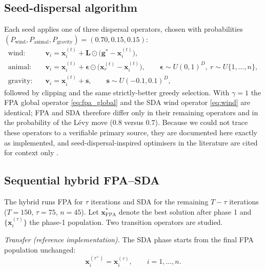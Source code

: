 \documentclass[10pt,letterpaper]{article}
\begin{document}
\subsection{Seed-dispersal algorithm}
Each seed applies one of three dispersal operators, chosen with probabilities $(P_{\mathrm{wind}},P_{\mathrm{animal}},P_{\mathrm{gravity}})=(0.70,0.15,0.15)$:
\begin{align}
\text{wind:}\quad & \mathbf{v}_i=\mathbf{x}_i^{(t)}+\mathbf{L}\odot\bigl(\mathbf{g}^{*}-\mathbf{x}_i^{(t)}\bigr),\label{eq:wind}\\
\text{animal:}\quad & \mathbf{v}_i=\mathbf{x}_i^{(t)}+\bm{\epsilon}\odot\bigl(\mathbf{x}_r^{(t)}-\mathbf{x}_i^{(t)}\bigr),\qquad \bm{\epsilon}\sim U(0,1)^D,\ r\sim U\{1,\dots,n\},\label{eq:animal}\\
\text{gravity:}\quad & \mathbf{v}_i=\mathbf{x}_i^{(t)}+\mathbf{s},\qquad \mathbf{s}\sim U(-0.1,0.1)^D,\label{eq:gravity}
\end{align}
followed by clipping and the same strictly-better greedy selection. With $\gamma=1$ the FPA global operator \eqref{eq:fpa_global} and the SDA wind operator \eqref{eq:wind} are identical; FPA and SDA therefore differ only in their remaining operators and in the probability of the Lévy move ($0.8$ versus $0.7$). Because we could not trace these operators to a verifiable primary source, they are documented here exactly as implemented, and seed-dispersal-inspired optimisers in the literature are cited for context only \citep{sulaiman2015sbppa,mohammadi2020ffa}.

\subsection{Sequential hybrid FPA--SDA}\label{sec:hybrid}
The hybrid runs FPA for $\tau$ iterations and SDA for the remaining $T-\tau$ iterations ($T=150$, $\tau=75$, $n=45$). Let $\mathbf{x}^{*}_{\mathrm{FPA}}$ denote the best solution after phase 1 and $\{\mathbf{x}_i^{(\tau)}\}$ the phase-1 population. Two transition operators are studied.

\emph{Transfer (reference implementation).} The SDA phase starts from the final FPA population unchanged:
\begin{equation}
\mathbf{x}_i^{(\tau^{+})}=\mathbf{x}_i^{(\tau)},\qquad i=1,\dots,n.
\label{eq:transfer}
\end{equation}
\end{document}
